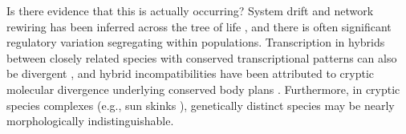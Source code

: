\documentclass{article}
\newcommand{\1}{\mathbbm{1}}
\begin{document}
Is there evidence that this is actually occurring?
System drift and network rewiring has been inferred across the tree of life \citep{wotton2015quantitative, crombach2016gap, dalal2017transcription, johnson2017rewiring, ali2017quantitative},
and there is often significant regulatory variation segregating within populations.
Transcription in hybrids between closely related species with conserved transcriptional patterns can also be divergent 
\citep{haerty2006gene, maheshwari2012cis, coolon2014tempo, michalak2004association, mack2016gene}, and hybrid incompatibilities have been attributed to cryptic molecular divergence underlying conserved body plans \citep{gavin2013embryonic}. 
Furthermore, in cryptic species complexes (e.g., sun skinks \citep{barley2013challenge}),
genetically distinct species
may be nearly morphologically indistinguishable.
\end{document}
